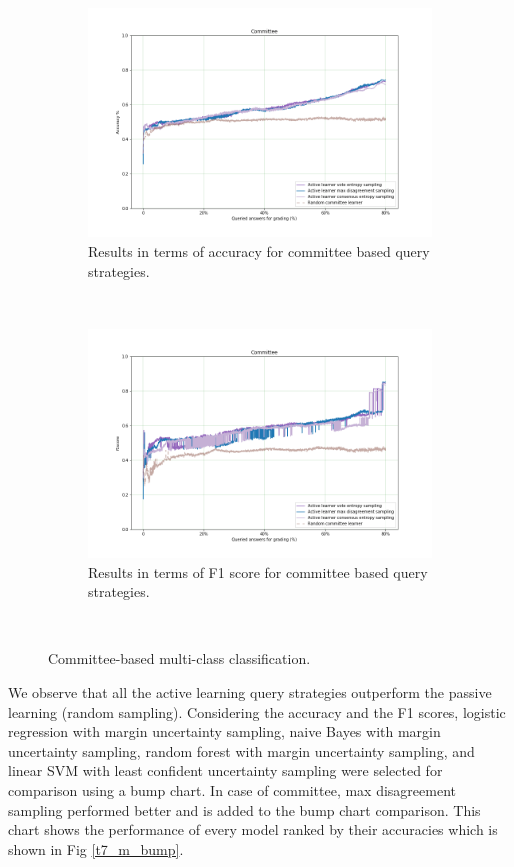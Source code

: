 \begin{figure}[!htb]
	\begin{subfigure}[b]{0.5\textwidth}
		\includegraphics[width=\textwidth]{images/task7_accuracy_com}
		\caption{Results in terms of accuracy for committee based query strategies.}
		\label{t7_m_com}
	\end{subfigure}
	~
	\begin{subfigure}[b]{0.5\textwidth}
		\includegraphics[width=\textwidth]{images/task7_f1score_com}
		\caption{Results in terms of F1 score for committee based query strategies.}
		\label{t7_m_com_f1}
	\end{subfigure}
	~
	\caption{Committee-based multi-class classification.}
\end{figure}

We observe that all the active learning query strategies outperform the passive learning (random sampling). Considering the accuracy and the F1 scores, logistic regression with margin uncertainty sampling, naive Bayes with margin uncertainty sampling, random forest with margin uncertainty sampling, and linear SVM with least confident uncertainty sampling were selected for comparison using a bump chart. In case of committee, max disagreement sampling performed better and is added to the bump chart comparison. This chart shows the performance of every model ranked by their accuracies which is shown in Fig \ref{t7_m_bump}.

